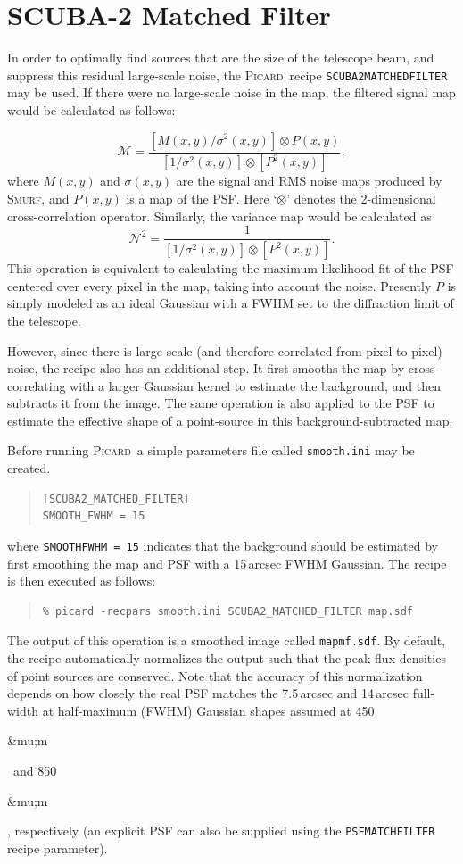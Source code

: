 \documentclass[twoside,11pt]{article}
\newcommand{\micron}{\mbox{\,${\umu}$m}}            %
\newcounter{box}
\newcommand{\xref}[3]{#1}
\newcommand{\xlabel}[1]{}
\renewcommand{\_}{\texttt{\symbol{95}}}
\newenvironment{myquote}{\begin{quote}\begin{small}}{\end{small}\end{quote}}
\newcommand{\picard}{\xref{\textsc{Picard}}{sun231}{}}
\newcommand{\smurf}{\xref{\textsc{Smurf}}{sun258}{}}
\newcommand{\drrecipe}[1]{\texttt{#1}}
\newcommand{\param}[1]{\texttt{#1}}
\renewcommand{\micron}{\begin{rawhtml}&mu;m\end{rawhtml}}
\begin{document}
\section{\xlabel{matchedfilter}SCUBA-2 Matched Filter}
\label{app:mf}
In order to optimally find sources that are the size of the telescope beam, and suppress this residual large-scale noise, the \picard\ recipe \drrecipe{SCUBA2\_MATCHED\_FILTER} may be used. If there were no large-scale noise in the map, the filtered signal map would be calculated as follows:

\begin{equation}
\mathcal{M} = \frac{[M(x,y)/\sigma^2(x,y)] \otimes P(x,y)}
  {[1/\sigma^2(x,y)] \otimes [P^2(x,y)]},
\end{equation}
%
where $M(x,y)$ and $\sigma(x,y)$ are the signal and RMS
noise maps produced by \smurf, and $P(x,y)$ is a map of the
PSF. Here `$\otimes$' denotes the 2-dimensional cross-correlation
operator. Similarly, the variance map would be calculated as
%
\begin{equation}
  \mathcal{N}^2 = \frac{1}{[1/\sigma^2(x,y)] \otimes [P^2(x,y)]}.
\end{equation}
%
This operation is equivalent to calculating the maximum-likelihood fit
of the PSF centered over every pixel in the map, taking into account
the noise. Presently $P$ is simply modeled as an ideal Gaussian
with a FWHM set to the diffraction limit of the telescope.

However, since there is large-scale (and therefore correlated from
pixel to pixel) noise, the recipe also has an additional step. It
first smooths the map by cross-correlating with a larger Gaussian
kernel to estimate the background, and then subtracts it from the
image. The same operation is also applied to the PSF to estimate the
effective shape of a point-source in this background-subtracted map.

Before running \picard\, a simple parameters file called \texttt{smooth.ini} may be created.
\begin{myquote}
\begin{verbatim}
[SCUBA2_MATCHED_FILTER]
SMOOTH_FWHM = 15
\end{verbatim}
\end{myquote}
%
where \texttt{SMOOTH\_FWHM = 15} indicates that the background should
be estimated by first smoothing the map and PSF with a 15\,arcsec FWHM
Gaussian. The recipe is then executed as follows:
%
\begin{myquote}
\begin{verbatim}
% picard -recpars smooth.ini SCUBA2_MATCHED_FILTER map.sdf
\end{verbatim}
\end{myquote}
%
The output of this operation is a smoothed image called \texttt{map\_mf.sdf}. By default, the recipe automatically normalizes the output such that the peak flux densities of point sources are conserved. Note that the accuracy of this normalization depends on how closely the real PSF matches the 7.5\,arcsec and 14\,arcsec full-width at half-maximum (FWHM) Gaussian shapes assumed at 450\micron\ and 850\micron, respectively (an explicit PSF can also be supplied using the \param{PSF\_MATCHFILTER} recipe parameter).
\end{document}
